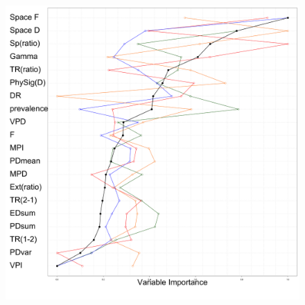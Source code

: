\documentclass[]{book}
\theoremstyle{definition}
\theoremstyle{definition}
\theoremstyle{remark}
\begin{document}
\begin{figure}
\centering
\includegraphics{var_import_all.png}
\caption{}
\end{figure}
\end{document}
